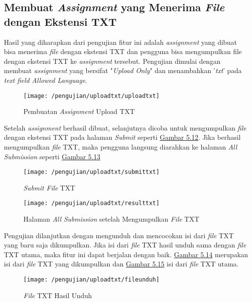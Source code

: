 	\subsection{Membuat \textit{Assignment} yang Menerima \textit{File} dengan Ekstensi TXT}
	Hasil yang diharapkan dari pengujian fitur ini adalah \textit{assignment} yang dibuat bisa menerima \textit{file} dengan ekstensi TXT dan pengguna bisa mengumpulkan file dengan ekstensi TXT ke \textit{assignment} tersebut. Pengujian dimulai dengan membuat \textit{assignment} yang bersifat "\textit{Upload Only}" dan menambahkan '\textit{txt}' pada \textit{text field Allowed Language}.
	\begin{figure}[H]
		\centering  
		\texttt{[image: /pengujian/uploadtxt/uploadtxt]}  
		\caption[Pembuatan \textit{Assignment} Upload TXT]{Pembuatan \textit{Assignment} Upload TXT} 
		\label{fig:uploadtxt} 
	\end{figure}
	
	Setelah \textit{assignment} berhasil dibuat, selanjutnya dicoba untuk mengumpulkan \textit{file} dengan ekstensi TXT pada halaman \textit{Submit} seperti \hyperref[fig:submittxt]{Gambar 5.12}. Jika berhasil mengumpulkan \textit{file} TXT, maka pengguna langsung diarahkan ke halaman \textit{All Submission} seperti \hyperref[fig:resultttxt]{Gambar 5.13}
	
	\begin{figure}[H]
		\centering  
		\texttt{[image: /pengujian/uploadtxt/submittxt]}  
		\caption[\textit{Submit File} TXT]{\textit{Submit File} TXT} 
		\label{fig:submittxt} 
	\end{figure}

	\begin{figure}[H]
		\centering  
		\texttt{[image: /pengujian/uploadtxt/resulttxt]}  
		\caption[Halaman \textit{All Submission} setelah Mengumpulkan \textit{File} TXT]{Halaman \textit{All Submission} setelah Mengumpulkan \textit{File} TXT} 
		\label{fig:resultttxt} 
	\end{figure}

	Pengujian dilanjutkan dengan mengunduh dan mencocokan isi dari \textit{file} TXT yang baru saja dikumpulkan. Jika isi dari \textit{file} TXT hasil unduh sama dengan \textit{file} TXT utama, maka fitur ini dapat berjalan dengan baik. \hyperref[fig:resultttxt]{Gambar 5.14} merupakan isi dari \textit{file} TXT yang dikumpulkan dan \hyperref[fig:resultttxt]{Gambar 5.15} isi dari \textit{file} TXT utama.
	
	\begin{figure}[H]
		\centering  
		\texttt{[image: /pengujian/uploadtxt/fileunduh]}  
		\caption[\textit{File} TXT Hasil Unduh]{\textit{File} TXT Hasil Unduh} 
		\label{fig:fileunduh} 
	\end{figure}
	
